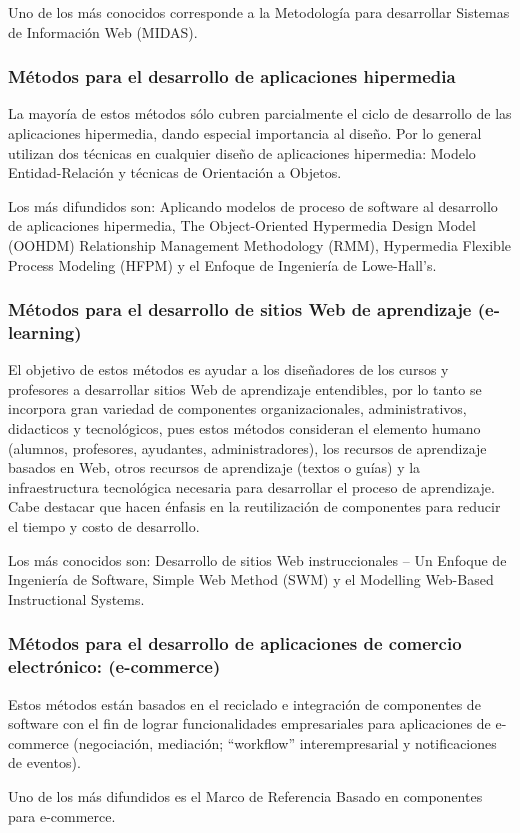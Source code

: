 Uno de los más conocidos corresponde a la Metodología para desarrollar Sistemas de Información Web (MIDAS).

\subsubsection{Métodos para el desarrollo de aplicaciones hipermedia}
La mayoría de estos métodos sólo cubren parcialmente el ciclo de desarrollo de las aplicaciones hipermedia, dando
especial importancia al diseño. Por lo general utilizan dos técnicas en cualquier diseño de aplicaciones hipermedia:
Modelo Entidad-Relación y técnicas de Orientación a Objetos. 

Los más difundidos son: Aplicando modelos de proceso
de software al desarrollo de aplicaciones hipermedia, The Object-Oriented Hypermedia Design Model (OOHDM)
Relationship Management Methodology (RMM), Hypermedia Flexible Process Modeling (HFPM) y el Enfoque de Ingeniería 
de Lowe-Hall’s.

\subsubsection{Métodos para el desarrollo de sitios Web de aprendizaje (e-learning)}
El objetivo de estos métodos es ayudar a los diseñadores de los cursos y profesores a desarrollar sitios Web de aprendizaje
entendibles, por lo tanto se incorpora gran variedad de componentes organizacionales, administrativos, didacticos y 
tecnológicos, pues estos métodos consideran el elemento humano (alumnos, profesores, ayudantes, administradores), 
los recursos de aprendizaje basados en Web, otros recursos de aprendizaje (textos o guías) y la infraestructura tecnológica 
necesaria para desarrollar el proceso de aprendizaje. Cabe destacar que hacen énfasis en la reutilización de componentes para reducir el 
tiempo y costo de desarrollo. 

Los más conocidos son: Desarrollo de sitios Web instruccionales – Un Enfoque de Ingeniería de Software, Simple Web Method (SWM) 
y el Modelling Web-Based Instructional Systems.


\subsubsection{Métodos para el desarrollo de aplicaciones de comercio electrónico: (e-commerce)}
Estos métodos están basados en el reciclado e integración de componentes de software con el fin de lograr funcionalidades 
empresariales para aplicaciones de e-commerce (negociación, mediación; “workflow” interempresarial y notificaciones de
eventos). 

Uno de los más difundidos es el Marco de Referencia Basado en componentes para e-commerce.


